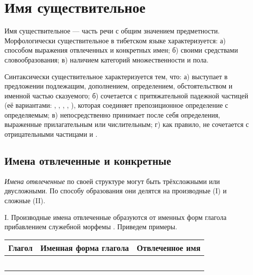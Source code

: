 \section{Имя существительное}

Имя существительное --- часть речи с общим значением предметности. Морфологически существительное в тибетском языке характеризуется: а) способом выражения отвлеченных и конкретных имен; б) своими средствами словообразования; в) наличием категорий множественности и пола.

Синтаксически существительное характеризуется тем, что: а) выступает в предложении подлежащим, дополнением, определением, обстоятельством и именной частью сказуемого; б) сочетается с притяжательной падежной частицей (её вариантами: , , , , ), которая соединяет препозиционное определение с определяемым; в) непосредственно принимает после себя определения, выраженные прилагательным или числительным; г) как правило, не сочетается с отрицательными частицами  и .

\subsection{Имена отвлеченные и конкретные}

\emph{Имена отвлеченные} по своей структуре могут быть трёхсложными или двусложными. По способу образования они делятся на производные (I) и сложные (II).

I. Производные имена отвлеченные образуются от именных форм глагола прибавлением служебной морфемы . Приведем примеры.

\begin{tabularx}{\textwidth}{*{3}{p{}}}
    \toprule
    \parbox[m]{0.3\textwidth}{Глагол} & \parbox[m]{0.3\textwidth}{\centering Именная форма глагола} & \parbox[m]{0.3\textwidth}{\centering Отвлеченное имя}\\
    \midrule
     &  & \\
     &  & \\
     &  & \\
     &  & \\
     &  & \\
    \bottomrule
\end{tabularx}

